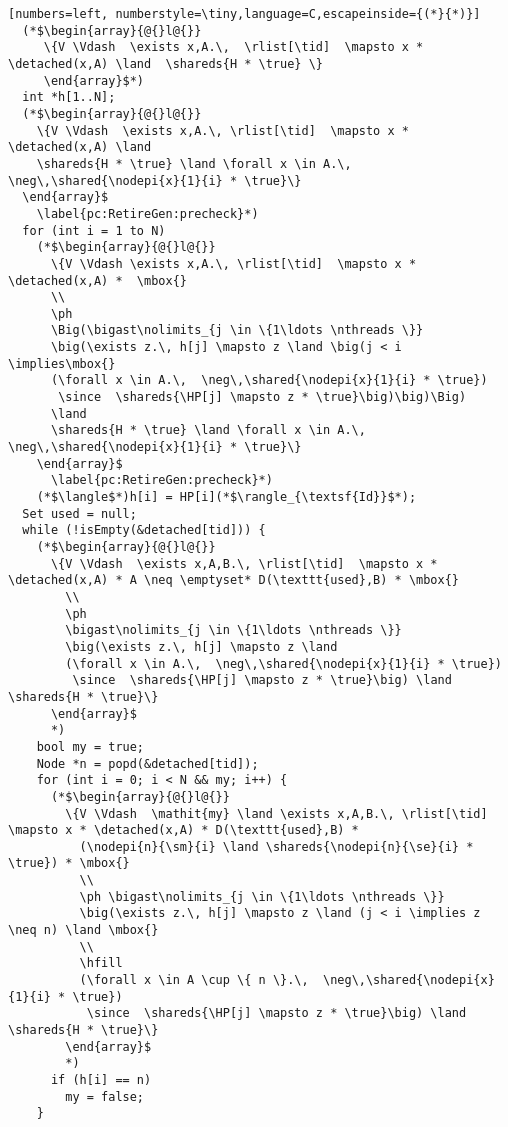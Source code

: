 \begin{figure*}
{\begin{lstlisting}[numbers=left, numberstyle=\tiny,language=C,escapeinside={(*}{*)}]
  (*$\begin{array}{@{}l@{}}
     \{V \Vdash  \exists x,A.\,  \rlist[\tid]  \mapsto x * \detached(x,A) \land  \shareds{H * \true} \}
     \end{array}$*) 
  int *h[1..N];
  (*$\begin{array}{@{}l@{}} 
    \{V \Vdash  \exists x,A.\, \rlist[\tid]  \mapsto x * \detached(x,A) \land  
    \shareds{H * \true} \land \forall x \in A.\, \neg\,\shared{\nodepi{x}{1}{i} * \true}\}
  \end{array}$
    \label{pc:RetireGen:precheck}*)  
  for (int i = 1 to N)
    (*$\begin{array}{@{}l@{}} 
      \{V \Vdash \exists x,A.\, \rlist[\tid]  \mapsto x * \detached(x,A) *  \mbox{}
      \\
      \ph
      \Big(\bigast\nolimits_{j \in \{1\ldots \nthreads \}}
      \big(\exists z.\, h[j] \mapsto z \land \big(j < i \implies\mbox{}
      (\forall x \in A.\,  \neg\,\shared{\nodepi{x}{1}{i} * \true}) 
       \since  \shareds{\HP[j] \mapsto z * \true}\big)\big)\Big) 
      \land
      \shareds{H * \true} \land \forall x \in A.\, \neg\,\shared{\nodepi{x}{1}{i} * \true}\}
    \end{array}$
      \label{pc:RetireGen:precheck}*)  
    (*$\langle$*)h[i] = HP[i](*$\rangle_{\textsf{Id}}$*);  
  Set used = null;
  while (!isEmpty(&detached[tid])) {
    (*$\begin{array}{@{}l@{}} 
      \{V \Vdash  \exists x,A,B.\, \rlist[\tid]  \mapsto x * \detached(x,A) * A \neq \emptyset* D(\texttt{used},B) * \mbox{}
        \\
        \ph
        \bigast\nolimits_{j \in \{1\ldots \nthreads \}}
        \big(\exists z.\, h[j] \mapsto z \land
        (\forall x \in A.\,  \neg\,\shared{\nodepi{x}{1}{i} * \true}) 
         \since  \shareds{\HP[j] \mapsto z * \true}\big) \land \shareds{H * \true}\}
      \end{array}$
      *)  
    bool my = true;
    Node *n = popd(&detached[tid]);    
    for (int i = 0; i < N && my; i++) {
      (*$\begin{array}{@{}l@{}} 
        \{V \Vdash  \mathit{my} \land \exists x,A,B.\, \rlist[\tid]  \mapsto x * \detached(x,A) * D(\texttt{used},B) * 
          (\nodepi{n}{\sm}{i} \land \shareds{\nodepi{n}{\se}{i} * \true}) * \mbox{}
          \\
          \ph \bigast\nolimits_{j \in \{1\ldots \nthreads \}}
          \big(\exists z.\, h[j] \mapsto z \land (j < i \implies z \neq n) \land \mbox{}
          \\
          \hfill
          (\forall x \in A \cup \{ n \}.\,  \neg\,\shared{\nodepi{x}{1}{i} * \true}) 
           \since  \shareds{\HP[j] \mapsto z * \true}\big) \land \shareds{H * \true}\}
        \end{array}$
        *)  
      if (h[i] == n)
        my = false;
    }
    

\end{lstlisting}}
\end{figure*}
